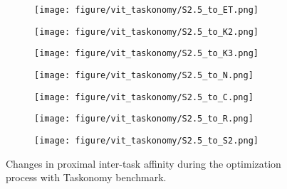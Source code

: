 \begin{figure}[h]
\begin{subfigure}{\figlength\textwidth}
\texttt{[image: figure/vit\_taskonomy/S2.5\_to\_ET.png]}
\end{subfigure}
\begin{subfigure}{\figlength\textwidth}
\texttt{[image: figure/vit\_taskonomy/S2.5\_to\_K2.png]}
\end{subfigure}
\begin{subfigure}{\figlength\textwidth}
\texttt{[image: figure/vit\_taskonomy/S2.5\_to\_K3.png]}
\end{subfigure}
\begin{subfigure}{\figlength\textwidth}
\texttt{[image: figure/vit\_taskonomy/S2.5\_to\_N.png]}
\end{subfigure}
\begin{subfigure}{\figlength\textwidth}
\texttt{[image: figure/vit\_taskonomy/S2.5\_to\_C.png]}
\end{subfigure}
\begin{subfigure}{\figlength\textwidth}
\texttt{[image: figure/vit\_taskonomy/S2.5\_to\_R.png]}
\end{subfigure}
\begin{subfigure}{\figlength\textwidth}
\texttt{[image: figure/vit\_taskonomy/S2.5\_to\_S2.png]}
\end{subfigure}
\caption{Changes in proximal inter-task affinity during the optimization process with Taskonomy benchmark.}
\label{fig:proximal_vit_taskonomy}
\end{figure}
\clearpage


